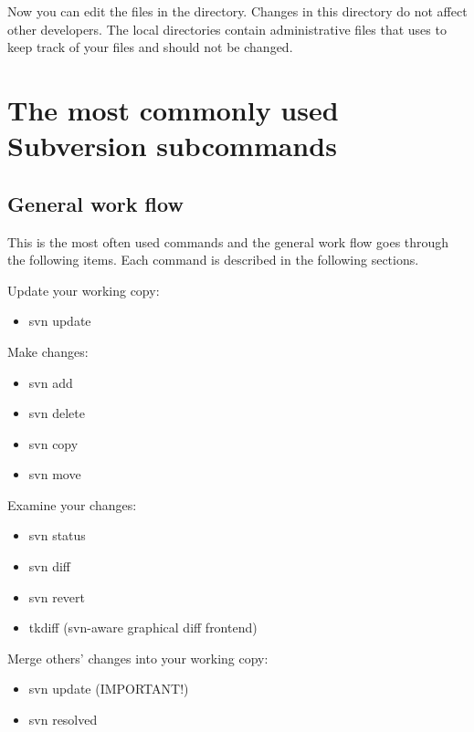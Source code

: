 \documentclass[10pt,a4paper]{simson}
\begin{document}
Now you can edit the files in the  directory. Changes in
this directory do not affect other developers. The local 
directories contain administrative files that  uses
to keep track of your files and should not be changed.


\section{The most commonly used Subversion subcommands}

\subsection{General work flow}
This is the most often used  commands and the
general work flow goes through the following items. Each command is
described in the following sections.

Update your working copy:
\begin{itemize}
\item svn update
\end{itemize}

Make changes:
\begin{itemize}
\item svn add
\item svn delete
\item svn copy
\item svn move
\end{itemize}

Examine your changes:
\begin{itemize}
\item svn status
\item svn diff
\item svn revert
\item tkdiff (svn-aware graphical diff frontend)
\end{itemize}

Merge others' changes into your working copy:
\begin{itemize}
\item svn update (IMPORTANT!)
\item svn resolved
\end{itemize}
\end{document}
